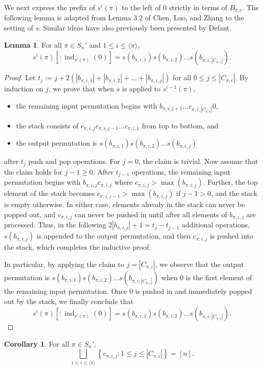 \documentclass[12pt]{amsart}
\DeclareMathOperator{\ind}{ind}
\newcommand{\met}[1]{\langle #1\rangle}
\theoremstyle{definition}
\newtheorem{lemma}[theorem]{Lemma}
\newtheorem{corollary}[theorem]{Corollary}
\begin{document}
We next express the prefix of $s^i(\pi)$ to the left of $0$ strictly in terms of $B_{\pi,i}$. The following lemma is adapted from Lemma 3.2 of Chen, Luo, and Zhang \cite{words} to the setting of $s$. Similar ideas have also previously been presented by Defant\cite{defant2}.
\begin{lemma}\label{lem:blocks_after_s}
For all $\pi\in S_n'$ and $1\le i\le \met{\pi}$,
\[s^i(\pi)[:\ind_{s^i(\pi)}(0)]=s(b_{\pi,i,1})s(b_{\pi,i,2})\dots s(b_{\pi,i,|C_{\pi,i}|}).\]
\end{lemma}
\begin{proof}
Let $t_j:=j+2(|b_{\pi,i,1}|+|b_{\pi,i,2}|+\dots+|b_{\pi,i,j}|)$ for all $0\le j\le |C_{\pi,i}|$. By induction on $j$, we prove that when $s$ is applied to $s^{i-1}(\pi)$,
\begin{itemize}
\item the remaining input permutation begins with $b_{\pi,i,j+1}\dots c_{\pi,i,|C_{\pi,i}|}0,$
\item the stack consists of $c_{\pi,i,j}c_{\pi,i,j-1}\dots c_{\pi,i,1}$ from top to bottom, and
\item the output permutation is $s(b_{\pi,i,1})s(b_{\pi,i,2})\dots s(b_{\pi,i,j})$
\end{itemize}
after $t_j$ push and pop operations. For $j=0$, the claim is trivial. Now assume that the claim holds for $j-1\ge 0$. After $t_{j-1}$ operations, the remaining input permutation begins with $b_{\pi,i,j}c_{\pi,i,j}$ where $c_{\pi,i,j} > \max(b_{\pi,i,j})$. Further, the top element of the stack becomes $c_{\pi,i,j-1}>\max(b_{\pi,i,j})$ if $j-1>0$, and the stack is empty otherwise. In either case, elements already in the stack can never be popped out, and $c_{\pi,i,j}$ can never be pushed in until after all elements of $b_{\pi,i,j}$ are processed. Thus, in the following $2|b_{\pi,i,j}|+1=t_j-t_{j-1}$ additional operations, $s(b_{\pi,i,j})$ is appended to the output permutation, and then $c_{\pi,i,j}$ is pushed into the stack, which completes the inductive proof. 

In particular, by applying the claim to $j=|C_{\pi,i}|$, we observe that the output permutation is $s(b_{\pi,i,1})s(b_{\pi,i,2})\dots s(b_{\pi,i,|C_{\pi,i}|})$ when $0$ is the first element of the remaining input permutation. Once $0$ is pushed in and immediately popped out by the stack, we finally conclude that
\[s^i(\pi)[:\ind_{s^i(\pi)}(0)]=s(b_{\pi,i,1})s(b_{\pi,i,2})\dots s(b_{\pi,i,|C_{\pi,i}|}).\]
\end{proof}
\begin{corollary}\label{col_well_defined}
For all $\pi\in S_n'$, \[\bigsqcup_{1\le i\le \met{\pi}} \left\{c_{\pi,i,j}:1\le j\le |C_{\pi,i}|\right\}=[n].\]
\end{corollary}
\end{document}
